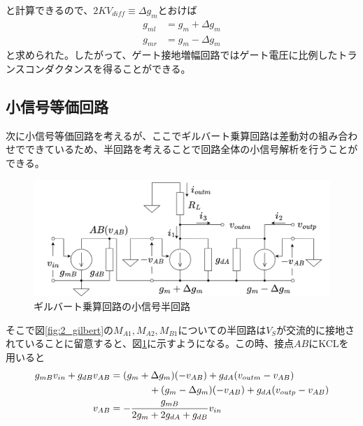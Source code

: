             と計算できるので、$2KV_{diff}\equiv\Delta g_{m}$とおけば
            \begin{align}
                g_{ml}&=g_{m}+\Delta g_{m}   \label{eq:2_dgml}\\
                g_{mr}&=g_{m}-\Delta g_{m}   \label{eq:2_dgmr}
            \end{align}
            と求められた。したがって、ゲート接地増幅回路ではゲート電圧に比例したトランスコンダクタンスを得ることができる。
            \newpage
            
        \subsection{小信号等価回路}
            次に小信号等価回路を考えるが、ここでギルバート乗算回路は差動対の組み合わせでできているため、半回路を考えることで回路全体の小信号解析を行うことができる。
            \begin{figure}[b]
                \begin{center}

                    \includegraphics[width=125mm]{figures/chapter2/halfeq.png}
                    \caption{ギルバート乗算回路の小信号半回路}
                    \label{fig:2_half}

                \end{center}

            \end{figure}
            そこで図\ref{fig:2_gilbert}の$M_{A1},M_{A2},M_{B1}$についての半回路は$V_{S}$が交流的に接地されていることに留意すると、図\ref{fig:2_half}に示すようになる。この時、接点$AB$にKCLを用いると
            \begin{align}
                g_{mB}v_{in}+g_{dB}v_{AB}&=(g_{m}+\Delta g_{m})(-v_{AB})+g_{dA}(v_{outm}-v_{AB})    \notag\\
                &\quad\quad\quad\quad +(g_{m}-\Delta g_{m})(-v_{AB})+g_{dA}(v_{outp}-v_{AB})     \notag\\
                v_{AB}&=-\frac{g_{mB}}{2g_{m}+2g_{dA}+g_{dB}}v_{in}     \label{eq:2_vab}
            \end{align}
